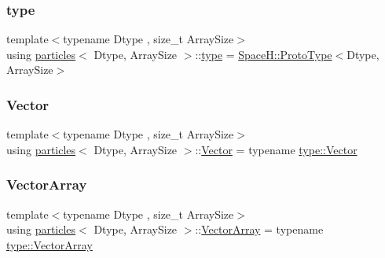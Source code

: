 \mbox{\label{classparticles_a56e76813d460aa266e75dbe0f0ee67da}} 
\subsubsection{\texorpdfstring{type}{type}}
{\footnotesize\ttfamily template$<$typename Dtype , size\+\_\+t Array\+Size$>$ \\
using \mbox{\hyperlink{classparticles}{particles}}$<$ Dtype, Array\+Size $>$\+::\mbox{\hyperlink{classparticles_a56e76813d460aa266e75dbe0f0ee67da}{type}} =  \mbox{\hyperlink{struct_space_h_1_1_proto_type}{Space\+H\+::\+Proto\+Type}}$<$Dtype, Array\+Size$>$}

\mbox{\label{classparticles_a1ef27d2f046db6514d79c8d7ee5c97d5}} 
\subsubsection{\texorpdfstring{Vector}{Vector}}
{\footnotesize\ttfamily template$<$typename Dtype , size\+\_\+t Array\+Size$>$ \\
using \mbox{\hyperlink{classparticles}{particles}}$<$ Dtype, Array\+Size $>$\+::\mbox{\hyperlink{classparticles_a1ef27d2f046db6514d79c8d7ee5c97d5}{Vector}} =  typename \mbox{\hyperlink{struct_space_h_1_1_proto_type_a316b81f4660b2b4fab14a8e1f23b6089}{type\+::\+Vector}}}

\mbox{\label{classparticles_ac5dddc8c666e4f7057b5109f95926363}} 
\subsubsection{\texorpdfstring{Vector\+Array}{VectorArray}}
{\footnotesize\ttfamily template$<$typename Dtype , size\+\_\+t Array\+Size$>$ \\
using \mbox{\hyperlink{classparticles}{particles}}$<$ Dtype, Array\+Size $>$\+::\mbox{\hyperlink{classparticles_ac5dddc8c666e4f7057b5109f95926363}{Vector\+Array}} =  typename \mbox{\hyperlink{struct_space_h_1_1_proto_type_a622b8e122b33bb4966a02299fb7b82d6}{type\+::\+Vector\+Array}}}




